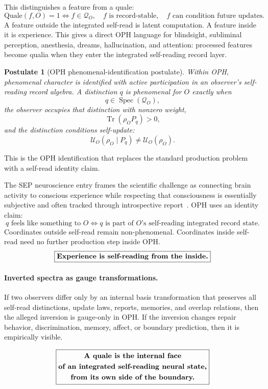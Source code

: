 \documentclass[11pt]{article}
\newtheorem{postulate}[theorem]{Postulate}
\theoremstyle{remark}
\theoremstyle{plain}
\begin{document}
This distinguishes a feature from a quale:
\[
\boxed{
\mathrm{Quale}(f,O)=1
\Longleftrightarrow
f\in\mathcal Q_O,\quad
f\text{ is record-stable},\quad
f\text{ can condition future updates}.
}
\]
A feature outside the integrated self-read is latent computation. A feature inside it is experience. This gives a direct OPH language for blindsight, subliminal perception, anesthesia, dreams, hallucination, and attention: processed features become qualia when they enter the integrated self-reading record layer.

\begin{postulate}[OPH phenomenal-identification postulate]
Within OPH, phenomenal character is identified with active participation in an observer's self-reading record algebra. A distinction \(q\) is phenomenal for \(O\) exactly when
\[
q\in\operatorname{Spec}(\mathcal Q_O),
\]
the observer occupies that distinction with nonzero weight,
\[
\operatorname{Tr}(\rho_O P_q)>0,
\]
and the distinction conditions self-update:
\[
\mathcal U_O(\rho_O\mid P_q)\ne \mathcal U_O(\rho_O).
\]
\end{postulate}

This is the OPH identification that replaces the standard production problem with a self-read identity claim.

The SEP neuroscience entry frames the scientific challenge as connecting brain activity to conscious experience while respecting that consciousness is essentially subjective and often tracked through introspective report~\cite{SEPNeuroscienceConsciousness}. OPH uses an identity claim:
\[
\boxed{
q\text{ feels like something to }O
\Longleftrightarrow
q\text{ is part of }O\text{'s self-reading integrated record state.}
}
\]
Coordinates outside self-read remain non-phenomenal. Coordinates inside self-read need no further production step inside OPH.
\[
\boxed{
\text{\bfseries Experience is self-reading from the inside.}
}
\]

\paragraph{Inverted spectra as gauge transformations.}
If two observers differ only by an internal basis transformation that preserves all self-read distinctions, update laws, reports, memories, and overlap relations, then the alleged inversion is gauge-only in OPH. If the inversion changes repair behavior, discrimination, memory, affect, or boundary prediction, then it is empirically visible.

\[
\boxed{
\begin{gathered}
\text{\bfseries A quale is the internal face}\\
\text{\bfseries of an integrated self-reading neural state,}\\
\text{\bfseries from its own side of the boundary.}
\end{gathered}
}
\]
\end{document}
